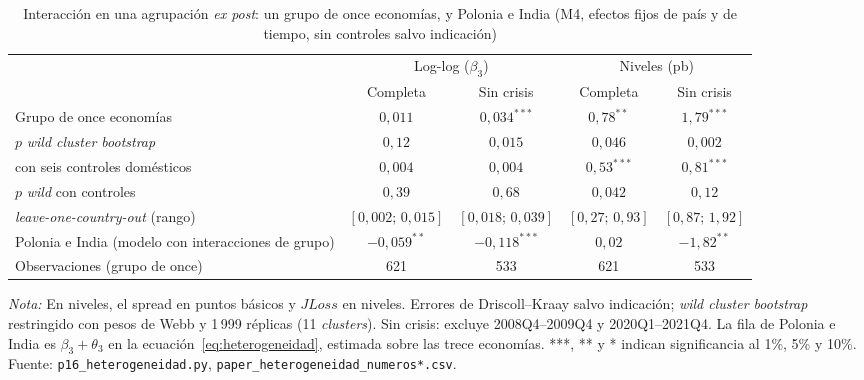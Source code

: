 \begin{table}[htbp]
\centering
\small
\caption[Heterogeneidad por tipo de economía: agrupación \textit{ex post}]{Interacción en una agrupación \textit{ex post}: un grupo de once economías, y Polonia e India (M4, efectos fijos de país y de tiempo, sin controles salvo indicación)}
\label{tab:heterogeneidad}
\begin{adjustbox}{max width=\linewidth}
\begin{tabular}{l cc cc}
\toprule
 & \multicolumn{2}{c}{Log-log ($\beta_3$)} & \multicolumn{2}{c}{Niveles (pb)} \\
\cmidrule(lr){2-3}\cmidrule(lr){4-5}
 & Completa & Sin crisis & Completa & Sin crisis \\
\midrule
Grupo de once economías & $0{,}011$ & $0{,}034^{***}$ & $0{,}78^{**}$ & $1{,}79^{***}$ \\
\quad $p$ \textit{wild cluster bootstrap} & $0{,}12$ & $0{,}015$ & $0{,}046$ & $0{,}002$ \\
\quad con seis controles domésticos & $0{,}004$ & $0{,}004$ & $0{,}53^{***}$ & $0{,}81^{***}$ \\
\quad $p$ \textit{wild} con controles & $0{,}39$ & $0{,}68$ & $0{,}042$ & $0{,}12$ \\
\quad \textit{leave-one-country-out} (rango) & $[0{,}002;\,0{,}015]$ & $[0{,}018;\,0{,}039]$ & $[0{,}27;\,0{,}93]$ & $[0{,}87;\,1{,}92]$ \\
\addlinespace
Polonia e India (modelo con interacciones de grupo) & $-0{,}059^{**}$ & $-0{,}118^{***}$ & $0{,}02$ & $-1{,}82^{**}$ \\
\addlinespace
Observaciones (grupo de once) & 621 & 533 & 621 & 533 \\
\bottomrule
\end{tabular}
\end{adjustbox}
\par\smallskip\parbox{0.95\linewidth}{\footnotesize \textit{Nota:} En niveles, el spread en puntos básicos y $JLoss$ en niveles. Errores de Driscoll--Kraay salvo indicación; \textit{wild cluster bootstrap} restringido con pesos de Webb y 1\,999 réplicas (11 \textit{clusters}). Sin crisis: excluye 2008Q4--2009Q4 y 2020Q1--2021Q4. La fila de Polonia e India es $\beta_3+\theta_3$ en la ecuación~\eqref{eq:heterogeneidad}, estimada sobre las trece economías. ***, ** y * indican significancia al 1\%, 5\% y 10\%. Fuente: \texttt{p16\_heterogeneidad.py}, \texttt{paper\_heterogeneidad\_numeros*.csv}.}
\end{table}

